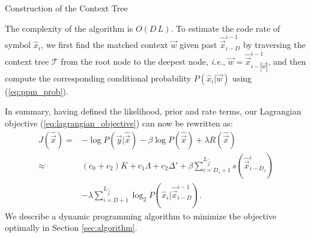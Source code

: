 \begin{algorithm}
\caption{Construction of the Context Tree}
\label{al:contextTree}
\begin{algorithmic}[1]



\Else
\EndIf

\EndFor


\end{algorithmic}
\end{algorithm}


The complexity of the algorithm is $O(D \, L)$.
To estimate the code rate of symbol $\hat{x}_i$, we first find the matched context $\vec{w}$ given past $\hat{\vec{x}}_{i-D}^{i-1}$ by traversing the context tree $\mathcal{T}$ from the root node to the deepest node, \textit{i.e.}, $\vec{w}=\hat{\vec{x}}^{i-1}_{i-|\vec{w}|}$, and then compute the corresponding conditional probability $P(\hat{x}_i|\vec{w})$ using (\ref{eq:ppm_prob}).

In summary, having defined the likelihood, prior and rate terms, our Lagrangian objective (\ref{eq:lagrangian_objective}) can now be rewritten as:
\begin{equation}
\label{eq:objective}
\begin{split}
J(\hat{\vec{x}})=& -\log P(\vec{y}|\hat{\vec{x}})-\beta \log P(\hat{\vec{x}}) + \lambda R(\hat{\vec{x}})\\
\approx &(c_0 + c_2) K + c_1 \Lambda + c_2 \Delta' +\beta \sum\limits_{i=D_s+1}^{L_{\hat{\vec{x}}}} s(\hat{\vec{x}}_{i-D_s}^i)\\
 &- \lambda \sum\limits_{i=D+1}^{L_{\hat{\vec{x}}}} \log_2 P(\hat{x}_i|\hat{\vec{x}}_{i-D}^{i-1}). 
\end{split}
\end{equation}
We describe a dynamic programming algorithm to minimize the objective optimally in Section \ref{sec:algorithm}.